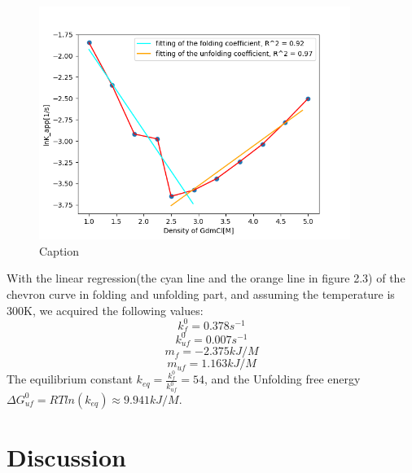 \documentclass[a4paper,english,12pt,bibliography=totoc]{scrreprt}
\begin{document}
\begin{figure}[H]
    \centering
    \includegraphics[width = 0.9\textwidth]{Images/Chevronplot.png}
    \caption{Caption}
    \label{fig:enter-label}
\end{figure}
With the linear regression(the cyan line and the orange line in figure 2.3) of the chevron curve in folding and unfolding part, and assuming the temperature is 300K, we acquired the following values:
\[
k_f^0 = 0.378 s^{-1}
\]
\[
k_{uf}^0 = 0.007 s^{-1}
\]
\[
m_f = -2.375 kJ/M
\]
\[
m_{uf} = 1.163 kJ/M 
\]
The equilibrium constant $k_{eq} = \frac{k_f^0}{k_{uf}^0} = 54$, and the Unfolding free energy $\Delta G_{uf}^0 = RTln(k_{eq}) \approx 9.941 kJ/M$.

\chapter{Discussion}
\label{cha:Discussion}
\end{document}
